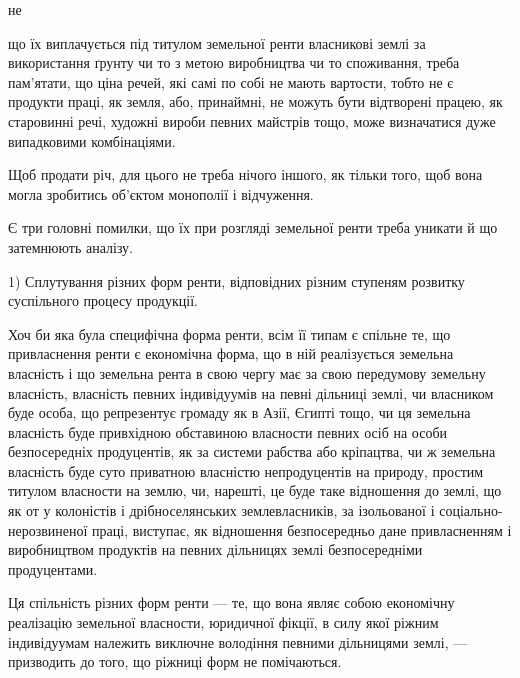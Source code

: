 \parcont{}  %
не

що їх виплачується під титулом земельної ренти власникові землі за використання
ґрунту чи то з метою виробництва чи то споживання, треба пам’ятати, що
ціна речей, які самі по собі не мають вартости, тобто не є продукти праці, як
земля, або, принаймні, не можуть бути відтворені працею, як старовинні речі,
художні вироби певних майстрів тощо, може визначатися дуже випадковими
комбінаціями.

Щоб продати річ, для цього не треба нічого іншого, як тільки того, щоб
вона могла зробитись об’єктом монополії і відчуження.

Є три головні помилки, що їх при розгляді земельної ренти треба уникати
й що затемнюють аналізу.

1) Сплутування різних форм ренти, відповідних різним ступеням розвитку
суспільного процесу продукції.

Хоч би яка була специфічна форма ренти, всім її типам є спільне те, що привласнення
ренти є економічна форма, що в ній реалізується земельна власність і що
земельна рента в свою чергу має за свою передумову земельну власність, власність
певних індивідуумів на певні дільниці землі, чи власником буде особа, що репрезентує
громаду як в Азії, Єгипті тощо, чи ця земельна власність буде привхідною
обставиною власности певних осіб на особи безпосередніх продуцентів, як за системи
рабства або кріпацтва, чи ж земельна власність буде суто приватною
власністю непродуцентів на природу, простим титулом власности на землю, чи,
нарешті, це буде таке відношення до землі, що як от у колоністів і дрібноселянських
землевласників, за ізольованої і соціально-нерозвиненої праці, виступає,
як відношення безпосередньо дане привласненням і виробництвом продуктів
на певних дільницях землі безпосередніми продуцентами.

Ця спільність різних форм ренти — те, що вона являє собою економічну
реалізацію земельної власности, юридичної фікції, в силу якої ріжним індивідуумам
належить виключне володіння певними дільницями землі, — призводить до
того, що ріжниці форм не помічаються.

